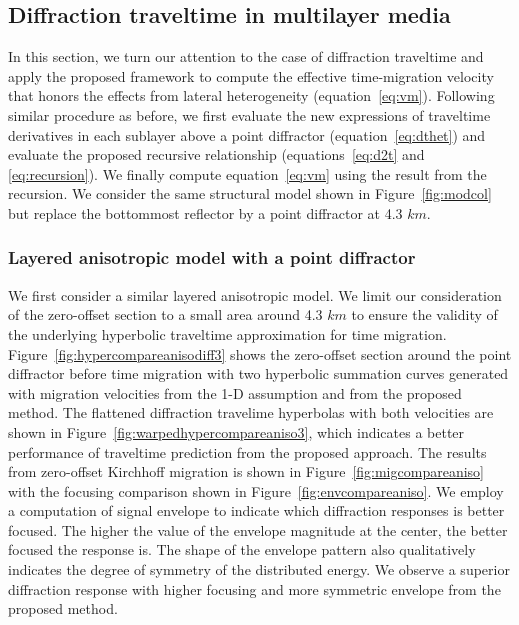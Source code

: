 
\subsection{Diffraction traveltime in multilayer media}
In this section, we turn our attention to the case of diffraction traveltime and apply the proposed framework to compute the effective time-migration velocity that honors the effects from lateral heterogeneity (equation~\ref{eq:vm}). Following similar procedure as before, we first evaluate the new expressions of traveltime derivatives in each sublayer above a point diffractor (equation~\ref{eq:dthet}) and evaluate the proposed recursive relationship (equations~\ref{eq:d2t} and \ref{eq:recursion}). We finally compute equation~\ref{eq:vm} using the result from the recursion. We consider the same structural model shown in Figure~\ref{fig:modcol} but replace the bottommost reflector by a point diffractor at 4.3 $km$.


\subsubsection{Layered anisotropic model with a point diffractor}

We first consider a similar layered anisotropic model. We limit our consideration of the zero-offset section to a small area around 4.3 $km$ to ensure the validity of the underlying hyperbolic traveltime approximation for time migration. Figure~\ref{fig:hypercompareanisodiff3} shows the zero-offset section around the point diffractor before time migration with two hyperbolic summation curves generated with migration velocities from the 1-D assumption and from the proposed method. The flattened diffraction travelime hyperbolas with both velocities are shown in Figure~\ref{fig:warpedhypercompareaniso3}, which indicates a better performance of traveltime prediction from the proposed approach. The results from zero-offset Kirchhoff migration is shown in Figure~\ref{fig:migcompareaniso} with the focusing comparison shown in Figure~\ref{fig:envcompareaniso}. We employ a computation of signal envelope to indicate which diffraction responses is better focused. The higher the value of the envelope magnitude at the center, the better focused the response is. The shape of the envelope pattern also qualitatively indicates the degree of symmetry of the distributed energy. We observe a superior diffraction response with higher focusing and more symmetric envelope from the proposed method.

